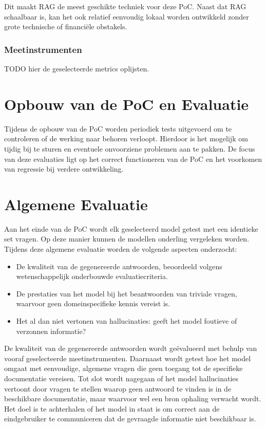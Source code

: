 Dit maakt RAG de meest geschikte techniek voor deze PoC. Naast dat RAG schaalbaar is, kan het ook relatief eenvoudig lokaal worden ontwikkeld zonder grote technische of financiële obstakels.

\subsubsection{Meetinstrumenten}

TODO hier de geselecteerde metrics oplijsten.

\section{Opbouw van de PoC en Evaluatie}

Tijdens de opbouw van de PoC worden periodiek tests uitgevoerd om te controleren of de werking naar behoren verloopt. Hierdoor is het mogelijk om tijdig bij te sturen en eventuele onvoorziene problemen aan te pakken. De focus van deze evaluaties ligt op het correct functioneren van de PoC en het voorkomen van regressie bij verdere ontwikkeling.

\section{Algemene Evaluatie}

Aan het einde van de PoC wordt elk geselecteerd model getest met een identieke set vragen. Op deze manier kunnen de modellen onderling vergeleken worden. Tijdens deze algemene evaluatie worden de volgende aspecten onderzocht:

\begin{itemize}
    \item De kwaliteit van de gegenereerde antwoorden, beoordeeld volgens wetenschappelijk onderbouwde evaluatiecriteria.
    \item De prestaties van het model bij het beantwoorden van triviale vragen, waarvoor geen domeinspecifieke kennis vereist is.
    \item Het al dan niet vertonen van hallucinaties: geeft het model foutieve of verzonnen informatie?
\end{itemize}


De kwaliteit van de gegenereerde antwoorden wordt geëvalueerd met behulp van vooraf geselecteerde meetinstrumenten. Daarnaast wordt getest hoe het model omgaat met eenvoudige, algemene vragen die geen toegang tot de specifieke documentatie vereisen. Tot slot wordt nagegaan of het model hallucinaties vertoont door vragen te stellen waarop geen antwoord te vinden is in de beschikbare documentatie, maar waarvoor wel een bron ophaling verwacht wordt. Het doel is te achterhalen of het model in staat is om correct aan de eindgebruiker te communiceren dat de gevraagde informatie niet beschikbaar is.

